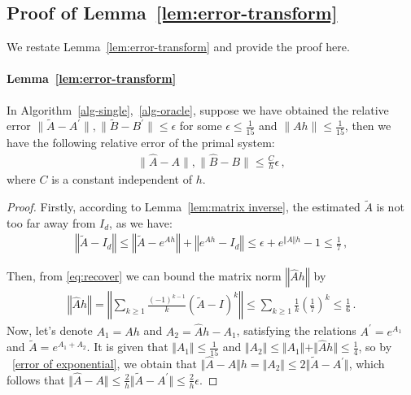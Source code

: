 \documentclass{article}
\theoremstyle{definition}
\begin{document}
\subsection{Proof of Lemma~\ref{lem:error-transform}}
We restate Lemma~\ref{lem:error-transform} and provide the proof here.
\paragraph{Lemma~\ref{lem:error-transform}}
In Algorithm~\ref{alg-single},~\ref{alg-oracle}, suppose we have obtained the relative error $\|\widetilde{A}-A^{'}\|,\|\widetilde{B}-B^{'}\|\leq \epsilon$ for some $\epsilon\leq \frac{1}{15}$ and  $\|Ah\|\leq \frac{1}{15}$, then we have the following relative error of the primal system: 
	\begin{align}
		\|\hat{A}-A\|,\|\hat{B}-B\|\leq \frac{C}{h}\epsilon\,,
	\end{align}
 where $C$ is a constant independent of $h$.
\begin{proof}
Firstly, according to Lemma~\ref{lem:matrix inverse}, the estimated $\widetilde{A}$ is not too far away from $I_{d}$, as we have:
\begin{align*}
\left\Vert \widetilde{A}-I_{d}\right\Vert \leq \left\Vert \widetilde{A}-e^{Ah}\right\Vert +\left\Vert e^{Ah}-I_{d}\right\Vert \leq \epsilon+e^{\Vert A\Vert h}-1\leq\frac{1}{7}\,,
\end{align*}

Then, from \eqref{eq:recover} we can bound the matrix norm $\left\Vert\hat{A}h\right\Vert$ by
\begin{align*}
\left\Vert \hat{A}h\right\Vert=\left\Vert\sum_{k\geq 1}\frac{(-1)^{k-1}}{k}(\widetilde{A}-I)^{k}\right\Vert\leq\sum_{k\geq 1}\frac{1}{k}(\frac{1}{7})^{k}\leq \frac{1}{6}\,.
\end{align*}
Now, let's denote $A_{1}=Ah$ and $A_{2}=\hat{A}h-A_{1}$, satisfying the relations $A^{'}=e^{A_{1}}$ and $\widetilde{A}=e^{A_{1}+A_{2}}$. It is given that $\Vert A_{1}\Vert \leq\frac{1}{15}$ and $\Vert A_{2}\Vert \leq \Vert A_{1}\Vert +\Vert \hat{A}h\Vert \leq \frac{1}{4}$, so by ~\eqref{error of exponential}, we obtain that $\Vert \hat{A}-A\Vert h=\Vert A_{2}\Vert \leq 2\Vert \widetilde{A}-A^{'}\Vert $, which follows that $\Vert \hat{A}-A\Vert \leq\frac{2}{h}\Vert \widetilde{A}-A^{'}\Vert \leq \frac{2}{h}\epsilon$.
\end{proof}
\end{document}
